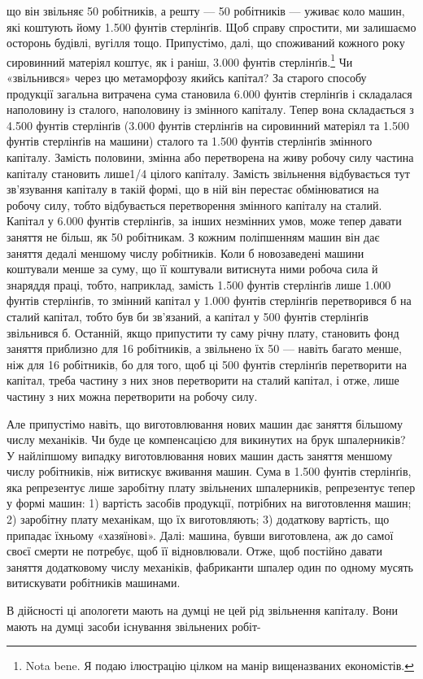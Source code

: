 що він звільняє 50 робітників, а решту — 50 робітників — уживає
коло машин, які коштують йому 1.500 фунтів стерлінґів. Щоб
справу спростити, ми залишаємо осторонь будівлі, вугілля тощо.
Припустімо, далі, що споживаний кожного року сировинний
матеріял коштує, як і раніш, 3.000 фунтів стерлінґів.\footnote{
Nota bene. Я подаю ілюстрацію цілком на манір вищеназваних
економістів.
} Чи
«звільнився» через цю метаморфозу якийсь капітал? За старого
способу продукції загальна витрачена сума становила 6.000 фунтів
стерлінґів і складалася наполовину із сталого, наполовину із
змінного капіталу. Тепер вона складається з 4.500 фунтів стерлінґів
(3.000 фунтів стерлінґів на сировинний матеріял та 1.500 фунтів
стерлінґів на машини) сталого та 1.500 фунтів стерлінґів змінного
капіталу. Замість половини, змінна або перетворена на живу робочу
силу частина капіталу становить лише1/4 цілого капіталу. Замість
звільнення відбувається тут зв’язування капіталу в такій формі,
що в ній він перестає обмінюватися на робочу силу, тобто відбувається
перетворення змінного капіталу на сталий. Капітал у 6.000
фунтів стерлінґів, за інших незмінних умов, може тепер давати заняття
не більш, як 50 робітникам. З кожним поліпшенням машин він
дає заняття дедалі меншому числу робітників. Коли б новозаведені
машини коштували менше за суму, що її коштували витиснута
ними робоча сила й знаряддя праці, тобто, наприклад, замість
1.500 фунтів стерлінґів лише 1.000 фунтів стерлінґів, то змінний
капітал у 1.000 фунтів стерлінґів перетворився б на сталий капітал,
тобто був би зв’язаний, а капітал у 500 фунтів стерлінґів
звільнився б. Останній, якщо припустити ту саму річну плату,
становить фонд заняття приблизно для 16 робітників, а звільнено
їх 50 — навіть багато менше, ніж для 16 робітників, бо для того,
щоб ці 500 фунтів стерлінґів перетворити на капітал, треба частину
з них знов перетворити на сталий капітал, і отже, лише частину
з них можна перетворити на робочу силу.

Але припустімо навіть, що виготовлювання нових машин дає
заняття більшому числу механіків. Чи буде це компенсацією
для викинутих на брук шпалерників? У найліпшому випадку
виготовлювання нових машин дасть заняття меншому числу
робітників, ніж витискує вживання машин. Сума в 1.500 фунтів
стерлінґів, яка репрезентує лише заробітну плату звільнених
шпалерників, репрезентує тепер у формі машин: 1) вартість засобів
продукції, потрібних на виготовлення машин; 2) заробітну
плату механікам, що їх виготовляють; 3) додаткову вартість, що
припадає їхньому «хазяїнові». Далі: машина, бувши виготовлена,
аж до самої своєї смерти не потребує, щоб її відновлювали. Отже,
щоб постійно давати заняття додатковому числу механіків, фабриканти
шпалер один по одному мусять витискувати робітників
машинами.

В дійсності ці апологети мають на думці не цей рід звільнення
капіталу. Вони мають на думці засоби існування звільнених робіт-
